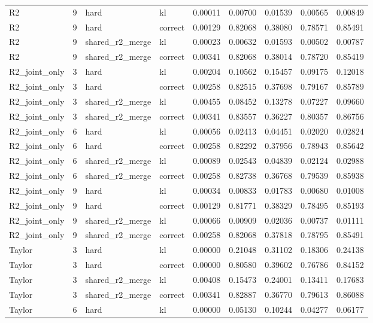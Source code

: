 \begin{tabular}{lrllrrrrr}
R2 & 9 & hard & kl & 0.00011 & 0.00700 & 0.01539 & 0.00565 & 0.00849 \\
R2 & 9 & hard & correct & 0.00129 & 0.82068 & 0.38080 & 0.78571 & 0.85491 \\
R2 & 9 & shared_r2_merge & kl & 0.00023 & 0.00632 & 0.01593 & 0.00502 & 0.00787 \\
R2 & 9 & shared_r2_merge & correct & 0.00341 & 0.82068 & 0.38014 & 0.78720 & 0.85419 \\
R2_joint_only & 3 & hard & kl & 0.00204 & 0.10562 & 0.15457 & 0.09175 & 0.12018 \\
R2_joint_only & 3 & hard & correct & 0.00258 & 0.82515 & 0.37698 & 0.79167 & 0.85789 \\
R2_joint_only & 3 & shared_r2_merge & kl & 0.00455 & 0.08452 & 0.13278 & 0.07227 & 0.09660 \\
R2_joint_only & 3 & shared_r2_merge & correct & 0.00341 & 0.83557 & 0.36227 & 0.80357 & 0.86756 \\
R2_joint_only & 6 & hard & kl & 0.00056 & 0.02413 & 0.04451 & 0.02020 & 0.02824 \\
R2_joint_only & 6 & hard & correct & 0.00258 & 0.82292 & 0.37956 & 0.78943 & 0.85642 \\
R2_joint_only & 6 & shared_r2_merge & kl & 0.00089 & 0.02543 & 0.04839 & 0.02124 & 0.02988 \\
R2_joint_only & 6 & shared_r2_merge & correct & 0.00258 & 0.82738 & 0.36768 & 0.79539 & 0.85938 \\
R2_joint_only & 9 & hard & kl & 0.00034 & 0.00833 & 0.01783 & 0.00680 & 0.01008 \\
R2_joint_only & 9 & hard & correct & 0.00129 & 0.81771 & 0.38329 & 0.78495 & 0.85193 \\
R2_joint_only & 9 & shared_r2_merge & kl & 0.00066 & 0.00909 & 0.02036 & 0.00737 & 0.01111 \\
R2_joint_only & 9 & shared_r2_merge & correct & 0.00258 & 0.82068 & 0.37818 & 0.78795 & 0.85491 \\
Taylor & 3 & hard & kl & 0.00000 & 0.21048 & 0.31102 & 0.18306 & 0.24138 \\
Taylor & 3 & hard & correct & 0.00000 & 0.80580 & 0.39602 & 0.76786 & 0.84152 \\
Taylor & 3 & shared_r2_merge & kl & 0.00408 & 0.15473 & 0.24001 & 0.13411 & 0.17683 \\
Taylor & 3 & shared_r2_merge & correct & 0.00341 & 0.82887 & 0.36770 & 0.79613 & 0.86088 \\
Taylor & 6 & hard & kl & 0.00000 & 0.05130 & 0.10244 & 0.04277 & 0.06177 \\

\end{tabular}
